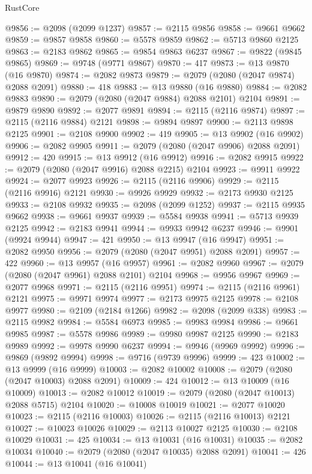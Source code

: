 \begin{lexlean}{RustCore}
\begin{coremodule}
@9856 := @2098 (@2099 @1237)
@9857 := @2115 @9856
@9858 := @9661 @9662
@9859 := @9857 @9858
@9860 := @5578 @9859
@9862 := @5713 @9860 @2125
@9863 := @2183 @9862
@9865 := @9854 @9863 @6237
@9867 := @9822 (@9845 @9865)
@9869 := @9748 (@9771 @9867)
@9870 := 417
@9873 := @13 @9870 (@16 @9870)
@9874 := @2082 @9873
@9879 := @2079 (@2080 (@2047 @9874) @2088 @2091)
@9880 := 418
@9883 := @13 @9880 (@16 @9880)
@9884 := @2082 @9883
@9890 := @2079 (@2080 (@2047 @9884) @2088 @2101) @2104
@9891 := @9879 @9890
@9892 := @2077 @9891
@9894 := @2115 (@2116 @9874)
@9897 := @2115 (@2116 @9884) @2121
@9898 := @9894 @9897
@9900 := @2113 @9898 @2125
@9901 := @2108 @9900
@9902 := 419
@9905 := @13 @9902 (@16 @9902)
@9906 := @2082 @9905
@9911 := @2079 (@2080 (@2047 @9906) @2088 @2091)
@9912 := 420
@9915 := @13 @9912 (@16 @9912)
@9916 := @2082 @9915
@9922 := @2079 (@2080 (@2047 @9916) @2088 @2215) @2104
@9923 := @9911 @9922
@9924 := @2077 @9923
@9926 := @2115 (@2116 @9906)
@9929 := @2115 (@2116 @9916) @2121
@9930 := @9926 @9929
@9932 := @2173 @9930 @2125
@9933 := @2108 @9932
@9935 := @2098 (@2099 @1252)
@9937 := @2115 @9935 @9662
@9938 := @9661 @9937
@9939 := @5584 @9938
@9941 := @5713 @9939 @2125
@9942 := @2183 @9941
@9944 := @9933 @9942 @6237
@9946 := @9901 (@9924 @9944)
@9947 := 421
@9950 := @13 @9947 (@16 @9947)
@9951 := @2082 @9950
@9956 := @2079 (@2080 (@2047 @9951) @2088 @2091)
@9957 := 422
@9960 := @13 @9957 (@16 @9957)
@9961 := @2082 @9960
@9967 := @2079 (@2080 (@2047 @9961) @2088 @2101) @2104
@9968 := @9956 @9967
@9969 := @2077 @9968
@9971 := @2115 (@2116 @9951)
@9974 := @2115 (@2116 @9961) @2121
@9975 := @9971 @9974
@9977 := @2173 @9975 @2125
@9978 := @2108 @9977
@9980 := @2109 (@2184 @1266)
@9982 := @2098 (@2099 @338)
@9983 := @2115 @9982
@9984 := @5584 @6973
@9985 := @9983 @9984
@9986 := @9661 @9985
@9987 := @5578 @9986
@9989 := @9980 @9987 @2125
@9990 := @2183 @9989
@9992 := @9978 @9990 @6237
@9994 := @9946 (@9969 @9992)
@9996 := @9869 (@9892 @9994)
@9998 := @9716 (@9739 @9996)
@9999 := 423
@10002 := @13 @9999 (@16 @9999)
@10003 := @2082 @10002
@10008 := @2079 (@2080 (@2047 @10003) @2088 @2091)
@10009 := 424
@10012 := @13 @10009 (@16 @10009)
@10013 := @2082 @10012
@10019 := @2079 (@2080 (@2047 @10013) @2088 @5715) @2104
@10020 := @10008 @10019
@10021 := @2077 @10020
@10023 := @2115 (@2116 @10003)
@10026 := @2115 (@2116 @10013) @2121
@10027 := @10023 @10026
@10029 := @2113 @10027 @2125
@10030 := @2108 @10029
@10031 := 425
@10034 := @13 @10031 (@16 @10031)
@10035 := @2082 @10034
@10040 := @2079 (@2080 (@2047 @10035) @2088 @2091)
@10041 := 426
@10044 := @13 @10041 (@16 @10041)

\end{coremodule}
\end{lexlean}
